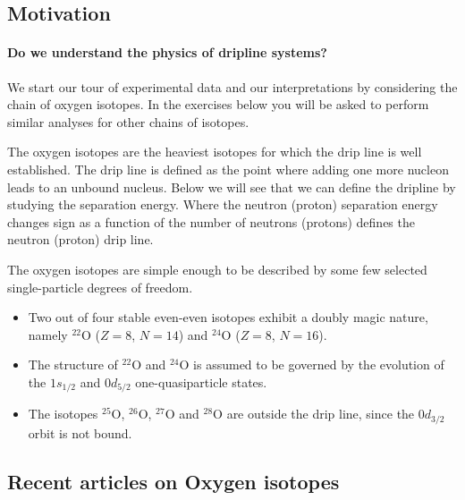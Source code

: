 \documentclass[%
twoside,                 %
final,                   %
10pt]{article}
\begin{document}
\subsection*{Motivation}

\paragraph{Do we understand the physics of dripline systems?}

We start our tour of experimental data and our interpretations by considering the chain of oxygen isotopes. In the exercises below you will be asked to perform similar analyses for other chains of isotopes.

The oxygen isotopes are the heaviest isotopes for which the drip line is well established.  The drip line is defined as the point where adding one more nucleon leads to an unbound nucleus. Below we will see that we can define the dripline by studying the separation energy. Where the neutron (proton) separation energy changes sign as a function of the number of neutrons (protons) defines the neutron (proton) drip line.

The oxygen isotopes are simple enough to be described by some few selected single-particle degrees of freedom.  

\begin{itemize}
\item Two out of four stable even-even isotopes exhibit a doubly magic nature, namely ${}^{22}\mbox{O}$ ($Z=8$, $N=14$) and ${}^{24}\mbox{O}$ ($Z=8$, $N=16$).

\item The structure of ${}^{22}\mbox{O}$ and ${}^{24}\mbox{O}$ is assumed to be governed by the evolution of the $1s_{1/2}$ and $0d_{5/2}$  one-quasiparticle states.

\item The isotopes ${}^{25}\mbox{O}$, ${}^{26}\mbox{O}$, ${}^{27}\mbox{O}$ and ${}^{28}\mbox{O}$ are outside the drip line, since the $0d_{3/2}$ orbit is not bound.
\end{itemize}

\noindent




\subsection*{Recent articles on Oxygen isotopes}
\end{document}
